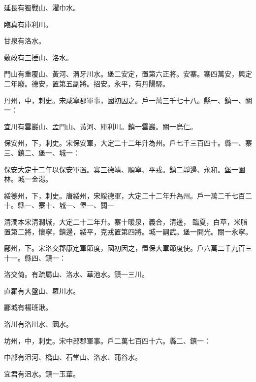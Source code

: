 \begin{pinyinscope}
 延長有獨戰山、濯巾水。



 臨真有庫利川。



 甘泉有洛水。



 敷政有三捶山、洛水。



 門山有重覆山、黃河、渭牙川水。堡二安定，置第六正將。安寨。寨四萬安，興定二年廢。德安，置第五副將。招安。永平，有丹陽驛。



 丹州，中，刺史。宋咸寧郡軍事，國初因之。戶一萬三千七十八。縣一、鎮一、關一：



 宜川有雲巖山、孟門山、黃河、庫利川。鎮一雲巖。關一烏仁。



 保安州，下，刺史。宋保安軍，大定二十二年升為州。戶七千三百四十。縣一、寨三、鎮二、堡一、城一：



 保安大定十二年以保安軍置。寨三德靖、順寧、平戎。鎮二靜邊、永和。堡一園林。城一金湯。



 綏德州，下，刺史。唐綏州，宋綏德軍，大定二十二年升為州。戶一萬二千七百二十。縣一、寨十、城一、堡一、關一



 清澗本宋清澗城，大定二十二年升。寨十暖泉，義合，清邊，
 臨夏，白草，米脂置第二將，懷寧，鎮邊，綏平，克戎置第四將。城一嗣武。堡一開光。關一永寧。



 鄜州，下。宋洛交郡康定軍節度，國初因之，置保大軍節度使。戶六萬二千九百三十一。縣四、鎮一：



 洛交倚。有疏屬山、洛水、華池水。鎮一三川。



 直羅有大盤山、羅川水。



 酈城有楊班湫。



 洛川有洛川水、圜水。



 坊州，中，刺史。宋中部郡軍事。戶二萬七百四十六。縣二、鎮一：



 中部有沮河、橋山、石堂山、洛水、蒲谷水。



 宜君有沮水。鎮一玉華。




\end{pinyinscope}
